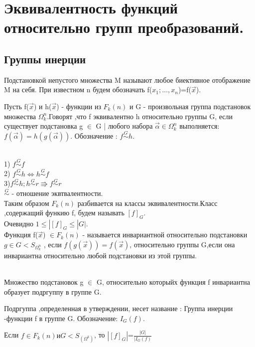 \section{Эквивалентность функций относительно групп преобразований.}

\subsection{Группы инерции}

\opr 
Подстановкой непустого множества M называют любое биективное отображение M на себя. При известном n будем обозначать f($x_1; \dotsc, x_n$)=f($\vec{x}$).

\opr 
Пусть f($\vec{x}$) и h($\vec{x}$) - функции из $F_k(n)$ и G - произвольная группа подстановок множества $\Omega_k^n$.Говорят ,что f эквивалентно h относительно группы G, если существует подстановка g $\in$ G | любого набора $\vec{\alpha} \in \Omega_k^n$ выполняется: $f(\vec{\alpha})=h(g(\vec{\alpha}))$. Обозначение : $f \stackrel{G}{\sim} h$.
 
\utv \\
1) $f \stackrel{G}{\sim} f$ \\
2) $f \stackrel{G}{\sim} h \Leftrightarrow h \stackrel{G}{\sim} f$ \\
3)$f \stackrel{G}{\sim} h;h \stackrel{G}{\sim} r \Rrightarrow f \stackrel{G}{\sim} r$\\

$\stackrel{G}{\sim}$ - отношение эквтвалентности.\\

Таким образом $F_k(n) $ разбивается на классы эквивалентности.Класс ,содержащий функию f, будем называть $[f]_G$. \\
Очевидно $1\leq|[f]_G\leq|G|$.\\


\opr 
Функция f($\vec{x}$) $\in F_k(n) $ - называется инвариантной относительно подстановки $g \in G < S_{\Omega_k^n}$ , если $f(g(\vec{x})) = f(\vec{x})$, относительно группы G,если она инвариантна относительно любой подстановки из этой группы.

\utv \\
Множество подстановок g $\in$ G, относительно которыйх функция f инвариантна образует подргуппу в группе G.

\opr 
Подргуппа ,определенная в утверждении, несет название : Группа инерции -функции f в группе G. Обозначение: $I_G(f)$.

\thr 
Если $f\in F_k(n) и G<S_(\Omega^k)$, то $|[f]_G|$=$\frac{|G|}{|I_G(f)}$

